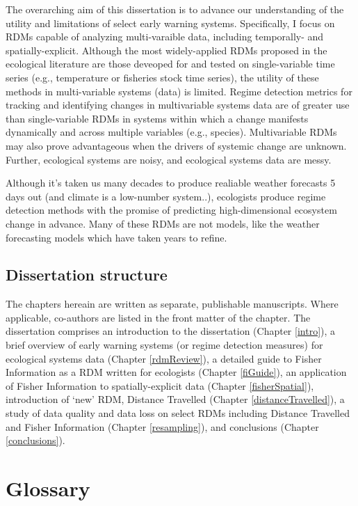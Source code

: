 \documentclass[12pt,twoside,openany]{reedthesis}
\begin{document}
The overarching aim of this dissertation is to advance our understanding of the utility and limitations of select early warning systems. Specifically, I focus on RDMs capable of analyzing multi-varaible data, including temporally- and spatially-explicit. Although the most widely-applied RDMs proposed in the ecological literature are those deveoped for and tested on single-variable time series (e.g., temperature or fisheries stock time series), the utility of these methods in multi-variable systems (data) is limited. Regime detection metrics for tracking and identifying changes in multivariable systems data are of greater use than single-variable RDMs in systems within which a change manifests dynamically and across multiple variables (e.g., species). Multivariable RDMs may also prove advantageous when the drivers of systemic change are unknown. Further, ecological systems are noisy, and ecological systems data are messy.

Although it's taken us many decades to produce realiable weather forecasts 5 days out (and climate is a low-number system..), ecologists produce regime detection methods with the promise of predicting high-dimensional ecosystem change in advance. Many of these RDMs are not models, like the weather forecasting models which have taken years to refine.

\hypertarget{dissertation-structure}{%
\subsection{Dissertation structure}\label{dissertation-structure}}

The chapters hereain are written as separate, publishable manuscripts. Where applicable, co-authors are listed in the front matter of the chapter. The dissertation comprises an introduction to the dissertation (Chapter \ref{intro}), a brief overview of early warning systems (or regime detection measures) for ecological systems data (Chapter \ref{rdmReview}), a detailed guide to Fisher Information as a RDM written for ecologists (Chapter \ref{fiGuide}), an application of Fisher Information to spatially-explicit data (Chapter \ref{fisherSpatial}), introduction of `new' RDM, Distance Travelled (Chapter \ref{distanceTravelled}), a study of data quality and data loss on select RDMs including Distance Travelled and Fisher Information (Chapter \ref{resampling}), and conclusions (Chapter \ref{conclusions}).

\hypertarget{glossary}{%
\section{Glossary}\label{glossary}}
\end{document}
